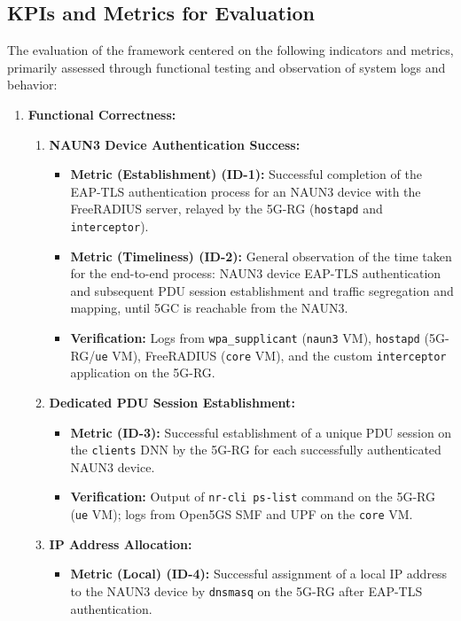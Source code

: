 \subsection{\acs{KPI}s and Metrics for Evaluation}

The evaluation of the framework centered on the following indicators and metrics, primarily assessed through functional testing and observation of system logs and behavior:

\begin{enumerate}
    \item{
        \textbf{Functional Correctness:}
        \begin{enumerate}
            \item {
                \textbf{\ac{NAUN3} Device Authentication Success:}
                \begin{itemize}
                    \item \textbf{Metric (Establishment) (ID-1):} Successful completion of the \ac{EAP-TLS} authentication process for an \ac{NAUN3} device with the FreeRADIUS server, relayed by the \ac{5G-RG} (\texttt{hostapd} and \texttt{interceptor}).

                    \item \textbf{Metric (Timeliness) (ID-2):} General observation of the time taken for the end-to-end process: \ac{NAUN3} device \ac{EAP-TLS} authentication and subsequent \ac{PDU} session establishment and traffic segregation and mapping, until \ac{5GC} is reachable from the \ac{NAUN3}.

                    \item \textbf{Verification:} Logs from \texttt{wpa\_supplicant} (\texttt{naun3} \ac{VM}), \texttt{hostapd} (\ac{5G-RG}/\texttt{ue} \ac{VM}), FreeRADIUS (\texttt{core} \ac{VM}), and the custom \texttt{interceptor} application on the \ac{5G-RG}. 
                \end{itemize}
            }
            \item {
                \textbf{Dedicated \ac{PDU} Session Establishment:}
                \begin{itemize}
                    \item \textbf{Metric (ID-3):} Successful establishment of a unique \ac{PDU} session on the \texttt{clients} \ac{DNN} by the \ac{5G-RG} for each successfully authenticated \ac{NAUN3} device.

                    \item \textbf{Verification:} Output of \texttt{nr-cli ps-list} command on the \ac{5G-RG} (\texttt{ue} \ac{VM}); logs from Open5GS \ac{SMF} and \ac{UPF} on the \texttt{core} \ac{VM}. 
                \end{itemize}
            }
            \item {
                \textbf{\ac{IP} Address Allocation:}
                \begin{itemize}
                    \item \textbf{Metric (Local) (ID-4):} Successful assignment of a local \ac{IP} address to the \ac{NAUN3} device by \texttt{dnsmasq} on the \ac{5G-RG} after \ac{EAP-TLS} authentication.


\end{itemize}}
\end{enumerate}}
\end{enumerate}
